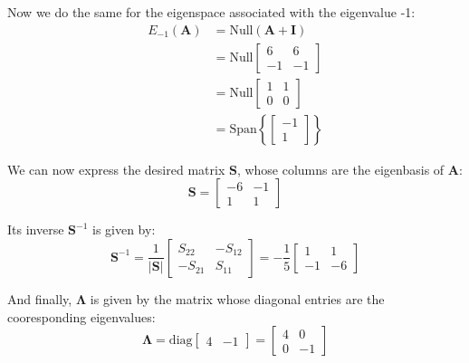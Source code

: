 \documentclass{article}
\begin{document}
Now we do the same for the eigenspace associated with the eigenvalue -1:
\begin{align*}
    E_{-1}(\mathbf{A})&=\text{Null}(\mathbf{A}+\mathbf{I})\tag{def. of eigenspace}\\
    &=\text{Null}\begin{bmatrix} 6 & 6 \\ -1 & -1 \end{bmatrix}\\
    &=\text{Null}\begin{bmatrix} 1 & 1 \\ 0 & 0 \end{bmatrix}\tag{ref}\\
    &=\text{Span}\left\{\begin{bmatrix} -1\\1\end{bmatrix}\right\}\tag{$x_1=-x_2$}
\end{align*}

We can now express the desired matrix $\mathbf{S}$, whose columns are the eigenbasis of $\mathbf{A}$:
\begin{equation*}
    \mathbf{S}=\begin{bmatrix} -6&-1\\1&1\end{bmatrix}
\end{equation*}

Its inverse $\mathbf{S}^{-1}$ is given by:
\begin{equation*}
\mathbf{S}^{-1}=\frac{1}{|\mathbf{S}|}\begin{bmatrix} S_{22}&-S_{12}\\-S_{21}&S_{11}\end{bmatrix}=-\frac{1}{5}\begin{bmatrix} 1&1\\-1&-6\end{bmatrix}
\end{equation*}

And finally, $\mathbf{\Lambda}$ is given by the matrix whose diagonal entries are the cooresponding eigenvalues:
\begin{equation*}
\mathbf{\Lambda}=\text{diag}\begin{bmatrix}4&-1\end{bmatrix}=\begin{bmatrix} 4&0\\0&-1\end{bmatrix}
\end{equation*}
\end{document}
